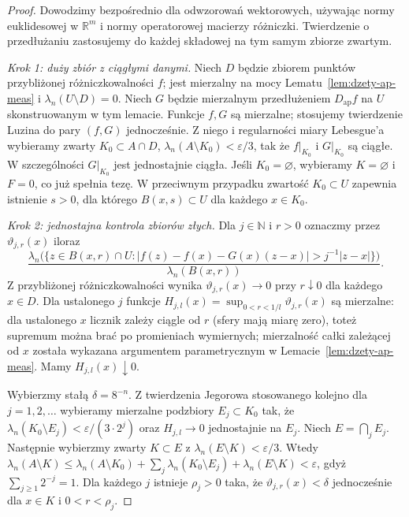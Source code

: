 \begin{proof}
Dowodzimy bezpośrednio dla odwzorowań wektorowych,
używając normy euklidesowej w $\mathbb R^m$
i normy operatorowej macierzy różniczki.
Twierdzenie o przedłużaniu zastosujemy do każdej
składowej na tym samym zbiorze zwartym.

\emph{Krok 1: duży zbiór z ciągłymi danymi.}
Niech $D$ będzie zbiorem punktów przybliżonej
różniczkowalności $f$; jest mierzalny na mocy
Lematu~\ref{lem:dzety-ap-meas} i $\lambda_n(U\setminus D)=0$.
Niech $G$ będzie mierzalnym przedłużeniem
$D_{\mathrm{ap}}f$ na $U$ skonstruowanym w tym lemacie.
Funkcje $f,G$ są mierzalne; stosujemy twierdzenie
Luzina do pary $(f,G)$ jednocześnie. Z niego i regularności
miary Lebesgue'a wybieramy zwarty $K_0\subset A\cap D$,
$\lambda_n(A\setminus K_0)<\varepsilon/3$, tak że
$f|_{K_0}$ i $G|_{K_0}$ są ciągłe.
W szczególności $G|_{K_0}$ jest jednostajnie ciągła.
Jeśli $K_0=\varnothing$, wybieramy $K=\varnothing$
i $F=0$, co już spełnia tezę. W przeciwnym przypadku
zwartość $K_0\subset U$ zapewnia istnienie $s>0$,
dla którego $B(x,s)\subset U$ dla każdego $x\in K_0$.

\emph{Krok 2: jednostajna kontrola zbiorów złych.}
Dla $j\in\mathbb N$ i $r>0$ oznaczmy przez
$\vartheta_{j,r}(x)$ iloraz
\[
 \frac{\lambda_n\bigl(\{z\in B(x,r)\cap U:
 |f(z)-f(x)-G(x)(z-x)|>j^{-1}|z-x|\}\bigr)}
 {\lambda_n(B(x,r))}.
\]
Z przybliżonej różniczkowalności wynika
$\vartheta_{j,r}(x)\to0$ przy $r\downarrow0$ dla
każdego $x\in D$. Dla ustalonego $j$ funkcje
$H_{j,l}(x)=\sup_{0<r<1/l}\vartheta_{j,r}(x)$ są
mierzalne: dla ustalonego $x$ licznik zależy ciągle
od $r$ (sfery mają miarę zero), toteż supremum można
brać po promieniach wymiernych; mierzalność całki
zależącej od $x$ została wykazana argumentem
parametrycznym w Lemacie~\ref{lem:dzety-ap-meas}.
Mamy $H_{j,l}(x)\downarrow0$.

Wybierzmy stałą $\delta=8^{-n}$. Z twierdzenia Jegorowa
stosowanego kolejno dla $j=1,2,\ldots$ wybieramy
mierzalne podzbiory $E_j\subset K_0$ tak, że
$\lambda_n(K_0\setminus E_j)<\varepsilon/(3\cdot 2^j)$
oraz $H_{j,l}\to0$ jednostajnie na $E_j$.
Niech $E=\bigcap_j E_j$. Następnie wybierzmy zwarty
$K\subset E$ z $\lambda_n(E\setminus K)<\varepsilon/3$.
Wtedy
$\lambda_n(A\setminus K)\le\lambda_n(A\setminus K_0)
+\sum_j\lambda_n(K_0\setminus E_j)+\lambda_n(E\setminus K)
<\varepsilon$, gdyż $\sum_{j\ge1}2^{-j}=1$.
Dla każdego $j$ istnieje $\rho_j>0$ taka, że
$\vartheta_{j,r}(x)<\delta$ jednocześnie dla
$x\in K$ i $0<r<\rho_j$.


\end{proof}
